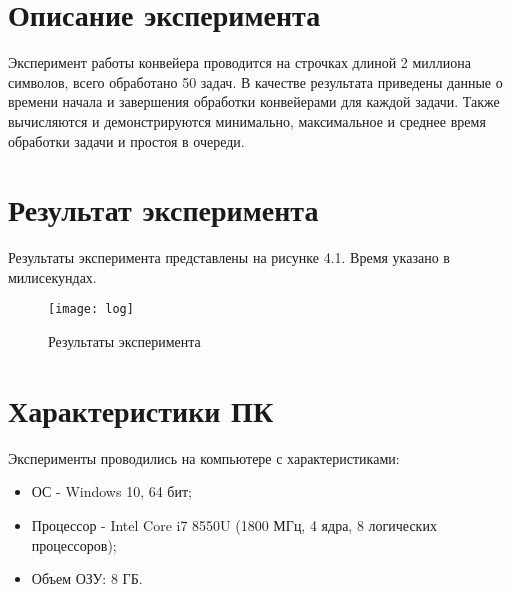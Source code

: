 \section{Описание эксперимента}
Эксперимент работы конвейера проводится на строчках длиной 2 миллиона символов, всего обработано 50 задач. В качестве результата приведены данные о времени начала и завершения обработки конвейерами для каждой задачи. Также вычисляются и демонстрируются минимально, максимальное и среднее время обработки задачи и простоя в очереди.

\section{Результат эксперимента}
Результаты эксперимента представлены на рисунке 4.1. Время указано в милисекундах.

\begin{figure}[h]
	\begin{center}
		{\texttt{[image: log]}}
		\caption{Результаты эксперимента}
	\end{center}
\end{figure}

\section{Характеристики ПК}
Эксперименты проводились на компьютере с характеристиками:
\begin{itemize}
	\item ОС - Windows 10, 64 бит;
	\item Процессор -  Intel Core i7 8550U (1800 МГц, 4 ядра, 8 логических процессоров);
	\item Объем ОЗУ: 8 ГБ.
\end{itemize}

